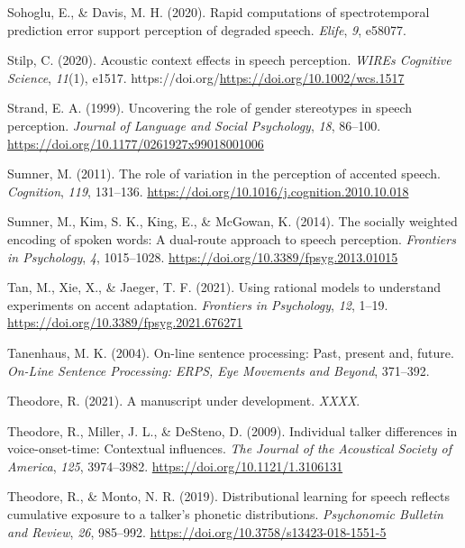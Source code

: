 \documentclass[
  11pt,
  english,
  man,floatsintext]{apa6}
\newlength{\cslhangindent}
\newlength{\cslentryspacingunit} %
\newenvironment{CSLReferences}[2] %
 {%
  \setlength{\parindent}{0pt}
  \ifodd #1
  \let\oldpar\par
  \def\par{\hangindent=\cslhangindent\oldpar}
  \fi
  \setlength{\parskip}{#2\cslentryspacingunit}
 }%
 {}
\begin{document}
\begin{CSLReferences}{1}{0}
\leavevmode{}%
Sohoglu, E., \& Davis, M. H. (2020). Rapid computations of spectrotemporal prediction error support perception of degraded speech. \emph{Elife}, \emph{9}, e58077.

\leavevmode{}%
Stilp, C. (2020). Acoustic context effects in speech perception. \emph{WIREs Cognitive Science}, \emph{11}(1), e1517. https://doi.org/\url{https://doi.org/10.1002/wcs.1517}

\leavevmode{}%
Strand, E. A. (1999). Uncovering the role of gender stereotypes in speech perception. \emph{Journal of Language and Social Psychology}, \emph{18}, 86--100. \url{https://doi.org/10.1177/0261927x99018001006}

\leavevmode{}%
Sumner, M. (2011). The role of variation in the perception of accented speech. \emph{Cognition}, \emph{119}, 131--136. \url{https://doi.org/10.1016/j.cognition.2010.10.018}

\leavevmode{}%
Sumner, M., Kim, S. K., King, E., \& McGowan, K. (2014). The socially weighted encoding of spoken words: A dual-route approach to speech perception. \emph{Frontiers in Psychology}, \emph{4}, 1015--1028. \url{https://doi.org/10.3389/fpsyg.2013.01015}

\leavevmode{}%
Tan, M., Xie, X., \& Jaeger, T. F. (2021). Using rational models to understand experiments on accent adaptation. \emph{Frontiers in Psychology}, \emph{12}, 1--19. \url{https://doi.org/10.3389/fpsyg.2021.676271}

\leavevmode{}%
Tanenhaus, M. K. (2004). On-line sentence processing: Past, present and, future. \emph{On-Line Sentence Processing: ERPS, Eye Movements and Beyond}, 371--392.

\leavevmode{}%
Theodore, R. (2021). A manuscript under development. \emph{XXXX}.

\leavevmode{}%
Theodore, R., Miller, J. L., \& DeSteno, D. (2009). Individual talker differences in voice-onset-time: Contextual influences. \emph{The Journal of the Acoustical Society of America}, \emph{125}, 3974--3982. \url{https://doi.org/10.1121/1.3106131}

\leavevmode{}%
Theodore, R., \& Monto, N. R. (2019). Distributional learning for speech reflects cumulative exposure to a talker's phonetic distributions. \emph{Psychonomic Bulletin and Review}, \emph{26}, 985--992. \url{https://doi.org/10.3758/s13423-018-1551-5}


\end{CSLReferences}
\end{document}
